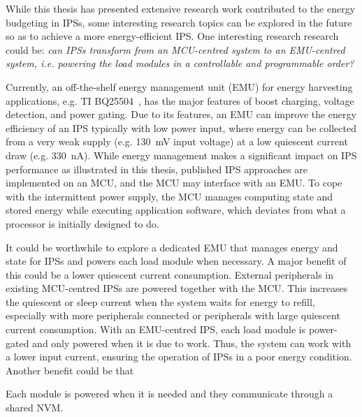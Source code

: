 While this thesis has presented extensive research work contributed to the energy budgeting in IPSs, some interesting research topics can be explored in the future so as to achieve a more energy-efficient IPS. 
One interesting research research could be: \textit{can IPSs transform from an MCU-centred system to an EMU-centred system, i.e. powering the load modules in a controllable and programmable order?} 

Currently, an off-the-shelf energy management unit (EMU) for energy harvesting applications, e.g. TI BQ25504~\cite{bq25504}, has the major features of boost charging, voltage detection, and power gating.
Due to its features, an EMU can improve the energy efficiency of an IPS typically with low power input, where energy can be collected from a very weak supply (e.g. \SI{130}{\milli\volt} input voltage) at a low quiescent current draw (e.g. \SI{330}{\nano\ampere}). 
While energy management makes a significant impact on IPS performance as illustrated in this thesis, published IPS approaches are implemented on an MCU, and the MCU may interface with an EMU.
To cope with the intermittent power supply, the MCU manages computing state and stored energy while executing application software, which deviates from what a processor is initially designed to do. 

It could be worthwhile to explore a dedicated EMU that manages energy and state for IPSs and powers each load module when necessary.
A major benefit of this could be a lower quiescent current consumption. %
External peripherals in existing MCU-centred IPSs are powered together with the MCU.
This increases the quiescent or sleep current when the system waits for energy to refill, especially with more peripherals connected or peripherals with large quiescent current consumption. 
With an EMU-centred IPS, each load module is power-gated and only powered when it is due to work. 
Thus, the system can work with a lower input current, ensuring the operation of IPSs in a poor energy condition. 
Another benefit could be that 



Each module is powered when it is needed and they communicate through a shared NVM. 

